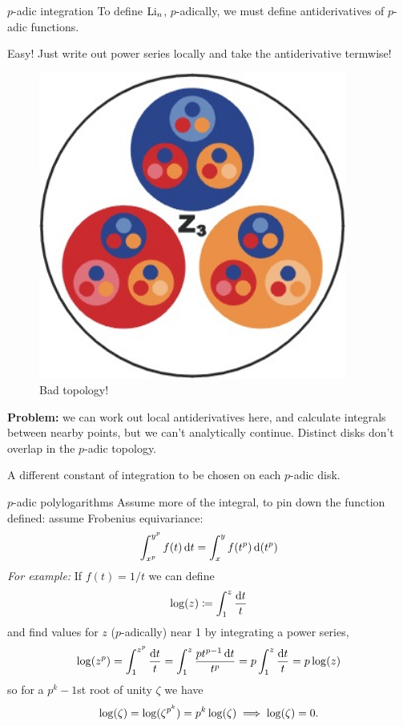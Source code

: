\begin{frame}{$p$-adic integration}
    To define $\operatorname{Li}_n$, $p$-adically, we must define antiderivatives of $p$-adic functions.

    Easy! Just write out power series locally and take the antiderivative termwise!\pause

    \begin{figure}
        \includegraphics[width=0.9\textwidth]{padic.jpg}
        \caption*{Bad topology!}
    \end{figure}
    \textbf{Problem:} we can work out local antiderivatives here, and calculate integrals between nearby points, but we can't analytically continue. Distinct disks don't overlap in the $p$-adic topology.
    
    A different constant of integration to be chosen on each $p$-adic disk.
\end{frame}


\begin{frame}{$p$-adic polylogarithms}
    Assume more of the integral, to pin down the function defined: assume Frobenius equivariance:
    \[\int_{x^p}^{y^p} f(t) \mathop{}\!\mathrm{d} t= \int_{x}^{y} f(t^p) \mathop{}\!\mathrm{d} (t^p) \]\pause
    \emph{For example:} If $f(t) = 1/t$ we can define 
    \[\log (z) \coloneqq \int_1^z\frac{ \mathop{}\!\mathrm{d} t}{t}\]
    and find values for $z$ ($p$-adically) near 1 by integrating a power series, 
    \[\log(z^p)= \int_{1}^{z^p} \frac{\mathop{}\!\mathrm{d} t}{t} = \int_{1}^{z} \frac{pt^{p-1}\mathop{}\!\mathrm{d} t}{t^p} 
    = p\int_{1}^{z} \frac{\mathop{}\!\mathrm{d} t}{t} = p\log(z)\]
    so for a $p^k-1$st root of unity $\zeta $ we have\[\log(\zeta ) = \log(\zeta ^{p^k}) = p^k \log(\zeta ) \implies \log(\zeta )= 0\text.\]
\end{frame}

